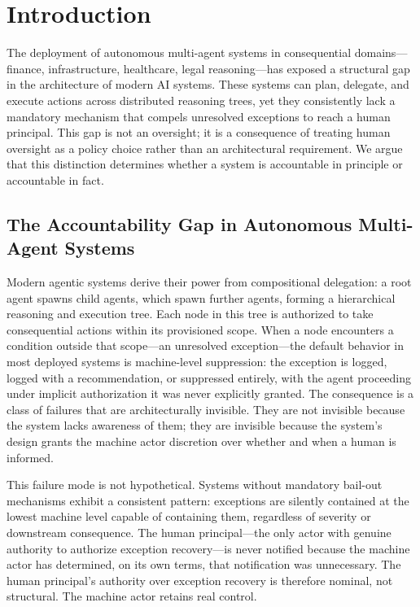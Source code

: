 \section{Introduction}

The deployment of autonomous multi-agent systems in consequential domains---finance, infrastructure, healthcare, legal reasoning---has exposed a structural gap in the architecture of modern AI systems. These systems can plan, delegate, and execute actions across distributed reasoning trees, yet they consistently lack a mandatory mechanism that compels unresolved exceptions to reach a human principal. This gap is not an oversight; it is a consequence of treating human oversight as a policy choice rather than an architectural requirement. We argue that this distinction determines whether a system is accountable in principle or accountable in fact.

\subsection{The Accountability Gap in Autonomous Multi-Agent Systems}

Modern agentic systems derive their power from compositional delegation: a root agent spawns child agents, which spawn further agents, forming a hierarchical reasoning and execution tree. Each node in this tree is authorized to take consequential actions within its provisioned scope. When a node encounters a condition outside that scope---an unresolved exception---the default behavior in most deployed systems is machine-level suppression: the exception is logged, logged with a recommendation, or suppressed entirely, with the agent proceeding under implicit authorization it was never explicitly granted. The consequence is a class of failures that are architecturally invisible. They are not invisible because the system lacks awareness of them; they are invisible because the system's design grants the machine actor discretion over whether and when a human is informed.

This failure mode is not hypothetical. Systems without mandatory bail-out mechanisms exhibit a consistent pattern: exceptions are silently contained at the lowest machine level capable of containing them, regardless of severity or downstream consequence. The human principal---the only actor with genuine authority to authorize exception recovery---is never notified because the machine actor has determined, on its own terms, that notification was unnecessary. The human principal's authority over exception recovery is therefore nominal, not structural. The machine actor retains real control.

